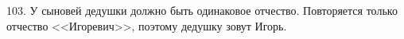 103. У сыновей дедушки должно быть одинаковое отчество. Повторяется только отчество <<Игоревич>>, поэтому дедушку зовут Игорь.\\
